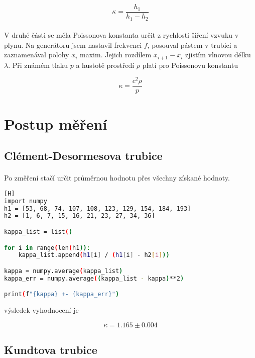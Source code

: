 \documentclass[a4paper,11pt]{article}
\begin{document}
    \begin{equation}
        \kappa = \frac{h_{1}}{h_{1} - h_{2}}
    \end{equation}

    \paragraph{} V druhé části se měla Poissonova konstanta určit z rychlosti 
    šíření vzvuku v plynu. Na generátoru jsem nastavil frekvenci $f$, posouval 
    pástem v trubici a zaznamenával polohy $x_{i}$ maxim. Jejich rozdílem 
    $x_{i + 1} - x_{i}$ zjistím vlnovou délku $\lambda$. Při známém tlaku $p$
    a hustotě prostředí $\rho$ platí pro Poissonovu konstantu

    \begin{equation}
        \kappa = \frac{c^{2} \rho}{p}
    \end{equation}

    
\section{Postup měření}

    \subsection{Clément-Desormesova trubice}

        \paragraph{} Po změření stačí určit průměrnou hodnotu přes všechny
        získané hodnoty.

\begin{lstlisting}[language=Bash][H]
import numpy
h1 = [53, 68, 74, 107, 108, 123, 129, 154, 184, 193]
h2 = [1, 6, 7, 15, 16, 21, 23, 27, 34, 36]

kappa_list = list()

for i in range(len(h1)):
    kappa_list.append(h1[i] / (h1[i] - h2[i]))

kappa = numpy.average(kappa_list)
kappa_err = numpy.average((kappa_list - kappa)**2)

print(f"{kappa} +- {kappa_err}")\end{lstlisting}

        výsledek vyhodnocení je

        $$ \kappa = 1.165 \pm 0.004$$

    \subsection{Kundtova trubice}
\end{document}
